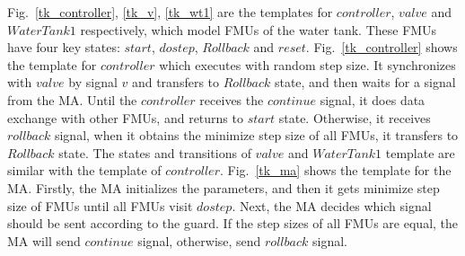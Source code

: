 \begin{figure}[htbp]
\end{figure}

Fig.~\ref{tk_controller}, \ref{tk_v}, \ref{tk_wt1} are the templates for $controller$, $valve$ and $WaterTank1$ respectively, which model FMUs of the water tank. These FMUs have four key states: $start$, $dostep$, $Rollback$ and $reset$. Fig.~\ref{tk_controller} shows the template for $controller$ which executes with random step size. It synchronizes with $valve$ by signal $v$ and transfers to $Rollback$ state, and then waits for a signal from the MA. Until the $controller$ receives the $continue$ signal, it does data exchange with other FMUs, and returns to $start$ state. Otherwise, it receives $rollback$ signal, when it obtains the minimize step size of all FMUs, it transfers to $Rollback$ state. The states and transitions of $valve$ and $WaterTank1$ template are similar with the template of $controller$. Fig.~\ref{tk_ma} shows the template for the MA. Firstly, the MA initializes the parameters, and then it gets minimize step size of FMUs until all FMUs visit $dostep$. Next, the MA decides which signal should be sent according to the guard. If the step sizes of all FMUs are equal, the MA will send $continue$ signal, otherwise, send $rollback$ signal.

